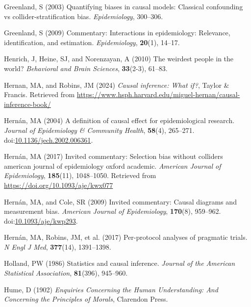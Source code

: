 \documentclass[
  single column]{article}
\newlength{\cslhangindent}
\newenvironment{CSLReferences}[2] %
 {\begin{list}{}{%
  \setlength{\itemindent}{0pt}
  \setlength{\leftmargin}{0pt}
  \setlength{\parsep}{0pt}
  \ifodd #1
   \setlength{\leftmargin}{\cslhangindent}
   \setlength{\itemindent}{-1\cslhangindent}
  \fi
  \setlength{\itemsep}{#2\baselineskip}}}
 {\end{list}}
\begin{document}
\begin{CSLReferences}{1}{0}
Greenland, S (2003) Quantifying biases in causal models: Classical
confounding vs collider-stratification bias. \emph{Epidemiology},
300--306.

Greenland, S (2009) Commentary: Interactions in epidemiology: Relevance,
identification, and estimation. \emph{Epidemiology}, \textbf{20}(1),
14--17.

Henrich, J, Heine, SJ, and Norenzayan, A (2010) The weirdest people in
the world? \emph{Behavioral and Brain Sciences}, \textbf{33}(2-3),
61--83.

Hernan, MA, and Robins, JM (2024) \emph{Causal inference: What if?},
Taylor \& Francis. Retrieved from
\url{https://www.hsph.harvard.edu/miguel-hernan/causal-inference-book/}

Hernán, MA (2004) A definition of causal effect for epidemiological
research. \emph{Journal of Epidemiology \& Community Health},
\textbf{58}(4), 265--271.
doi:\href{https://doi.org/10.1136/jech.2002.006361}{10.1136/jech.2002.006361}.

Hernán, MA (2017) Invited commentary: Selection bias without colliders
\textbar{} american journal of epidemiology \textbar{} oxford academic.
\emph{American Journal of Epidemiology}, \textbf{185}(11), 1048--1050.
Retrieved from \url{https://doi.org/10.1093/aje/kwx077}

Hernán, MA, and Cole, SR (2009) Invited commentary: Causal diagrams and
measurement bias. \emph{American Journal of Epidemiology},
\textbf{170}(8), 959--962.
doi:\href{https://doi.org/10.1093/aje/kwp293}{10.1093/aje/kwp293}.

Hernán, MA, Robins, JM, et al. (2017) Per-protocol analyses of pragmatic
trials. \emph{N Engl J Med}, \textbf{377}(14), 1391--1398.

Holland, PW (1986) Statistics and causal inference. \emph{Journal of the
American Statistical Association}, \textbf{81}(396), 945--960.

Hume, D (1902) \emph{Enquiries Concerning the Human Understanding: And
Concerning the Principles of Morals}, Clarendon Press.


\end{CSLReferences}
\end{document}
